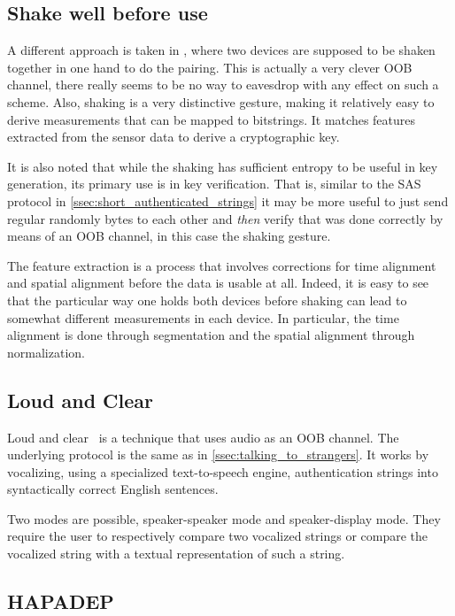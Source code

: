 \documentclass[conference, 12pt]{sty/IEEEtran}
\begin{document}
\subsection{Shake well before use}
A different approach is taken in \cite{mayrhofer2009shake}, where two devices are supposed to be shaken together in one hand to do the pairing.
This is actually a very clever OOB channel, there really seems to be no way to eavesdrop with any effect on such a scheme.
Also, shaking is a very distinctive gesture, making it relatively easy to derive measurements that can be mapped to bitstrings.
It matches features extracted from the sensor data to derive a cryptographic key.

It is also noted that while the shaking has sufficient entropy to be useful in key generation, its primary use is in key verification.
That is, similar to the SAS protocol in \autoref{ssec:short_authenticated_strings} it may be more useful to just send regular randomly bytes to each other and \emph{then} verify that was done correctly by means of an OOB channel, in this case the shaking gesture.

The feature extraction is a process that involves corrections for time alignment and spatial alignment before the data is usable at all.
Indeed, it is easy to see that the particular way one holds both devices before shaking can lead to somewhat different measurements in each device.
In particular, the time alignment is done through segmentation and the spatial alignment through normalization.

\subsection{Loud and Clear}
\label{ssec:loud_and_clear}

Loud and clear~\cite{goodrich2006loud} is a technique that uses audio as an OOB channel.
The underlying protocol is the same as in \autoref{ssec:talking_to_strangers}.
It works by vocalizing, using a specialized text-to-speech engine, authentication strings into syntactically correct English sentences.

Two modes are possible, speaker-speaker mode and speaker-display mode.
They require the user to respectively compare two vocalized strings or compare the vocalized string with a textual representation of such a string.

\subsection{HAPADEP}
\label{ssec:hapadep}
\end{document}
